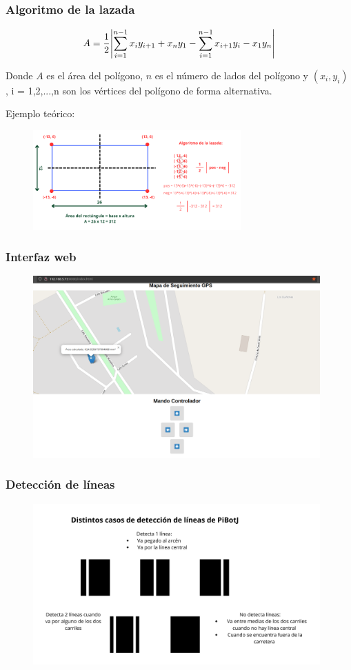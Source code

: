 \documentclass{beamer}
\begin{document}
\begin{frame}
	\frametitle{Algoritmo de la lazada}
	\centering
	\begin{equation*}
		A = \frac{1}{2}\abs{\sum_{i=1}^{n-1}x_i y_{i+1} + x_n y_1 - \sum_{i=1}^{n-1}x_{i+1} y_{i} - x_1 y_n}
	\end{equation*}

	Donde $A$ es el área del polígono, $n$ es el número de lados del polígono y $(x_i, y_i)$ , i = 1,2,...,n son los vértices del polígono de forma alternativa.\\[10pt]
	\raggedright Ejemplo teórico: 
	\begin{figure}
		\centering
		\includegraphics[width=8cm]{figs/demoshoelace.png}
	\end{figure}
\end{frame}

\begin{frame}
	\frametitle{Interfaz web}
	\begin{figure}
		\centering
		\includegraphics[width=11cm]{figs/interfazweb.png}
	\end{figure}
\end{frame}

\begin{frame}
	\frametitle{Detección de líneas}
	\begin{figure}
		\centering
		\includegraphics[width=11cm]{figs/casosdlines.png}
	\end{figure}
\end{frame}
\end{document}
